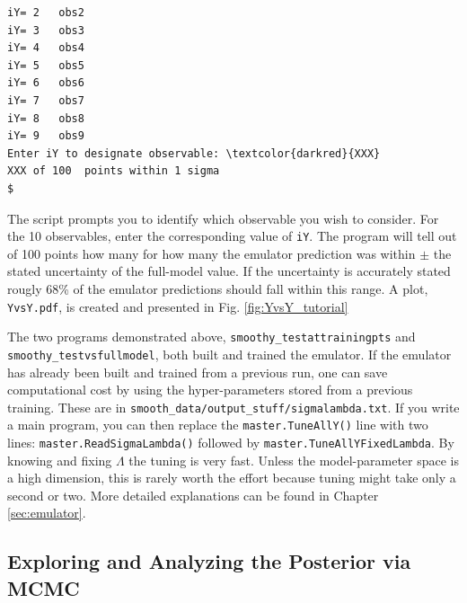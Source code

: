 \documentclass[UserManual.tex]{subfiles}
\begin{document}
\begin{sloppypar}
{\begin{Verbatim}[commandchars=\\\{\}]
iY= 2   obs2
iY= 3   obs3
iY= 4   obs4
iY= 5   obs5
iY= 6   obs6
iY= 7   obs7
iY= 8   obs8
iY= 9   obs9
Enter iY to designate observable: \textcolor{darkred}{XXX}
XXX of 100  points within 1 sigma
$\end{Verbatim}
}\vspace*{-8pt}
The script prompts you to identify which observable you wish to consider. For the 10 observables, enter the corresponding value of {\tt iY}. The program will tell out of 100 points how many for how many the emulator prediction was within $\pm$ the stated uncertainty of the full-model value. If the uncertainty is accurately stated rougly 68\% of the emulator predictions should fall within this range. A plot, {\tt YvsY.pdf}, is created and presented in Fig. \ref{fig:YvsY_tutorial}

The two programs demonstrated above, {\tt smoothy\_testattrainingpts} and {\tt smoothy\_testvsfullmodel}, both built and trained the emulator. If the emulator has already been built and trained from a previous run, one can save computational cost by using the hyper-parameters stored from a previous training. These are in {\tt smooth\_data/output\_stuff/sigmalambda.txt}. If you write a main program, you can then replace the {\tt master.TuneAllY()} line with two lines: {\tt master.ReadSigmaLambda()} followed by {\tt master.TuneAllYFixedLambda}. By knowing and fixing $\Lambda$ the tuning is very fast. Unless the model-parameter space is a high dimension, this is rarely worth the effort because tuning might take only a second or two. More detailed explanations can be found in Chapter \ref{sec:emulator}.


\subsection{Exploring and Analyzing the Posterior via MCMC}


\end{sloppypar}
\end{document}
